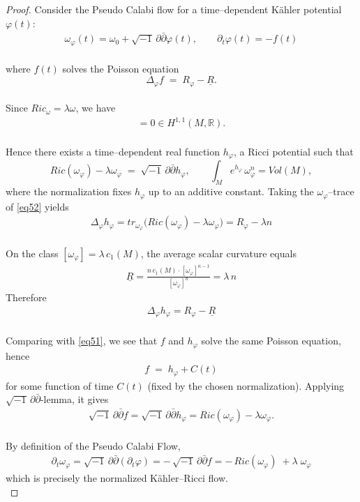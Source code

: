 \documentclass[11pt]{amsart}
\numberwithin{equation}{section}
\begin{document}
\begin{proof}
Consider the Pseudo Calabi flow for a time--dependent K\"ahler potential $\varphi(t)$:
\begin{align}
	\omega_\varphi(t)=\omega_0+\sqrt{-1}\,\partial\bar\partial\varphi(t),\qquad \partial_t\varphi(t)=-f(t)
\end{align}\\
where $f(t)$ solves the Poisson equation
\begin{equation}\label{eq51}
\Delta_{\varphi} f \;=\; R_\varphi-\underline{R}.
\end{equation}\\
Since $Ric_\omega = \lambda\omega$, we have
\begin{align}
	[Ric(\omega_\varphi) -\lambda \omega_\varphi]=0 \in H^{1,1}(M,\mathbb{R}).
\end{align}\\
Hence there exists a time--dependent real function $h_\varphi$, a Ricci potential such that
\begin{equation}\label{eq52}
	Ric(\omega_\varphi)-\lambda\omega_\varphi \;=\; \sqrt{-1}\,\partial\bar\partial h_\varphi, \qquad \int_M e^{h_\varphi}\,\omega_\varphi^n=Vol(M),
\end{equation}
where the normalization fixes $h_\varphi$ up to an additive constant. Taking the $\omega_\varphi$--trace of \eqref{eq52} yields
\begin{align}
	\Delta_{\varphi} h_\varphi = tr_{\omega_\varphi}\!\big(Ric(\omega_\varphi)-\lambda\omega_\varphi\big) = R_\varphi-\lambda n
\end{align}\\
On the class $[\omega_\varphi]= \lambda \,c_1(M)$, the average scalar curvature equals
\begin{align}
	\underline R =\frac{n\,c_1(M)\cdot [\omega_\varphi]^{n-1}}{[\omega_\varphi]^n} = \lambda\,n
\end{align}
Therefore
\begin{align}
	\Delta_{\varphi} h_\varphi = R_\varphi-\underline R
\end{align}\\
Comparing with \eqref{eq51}, we see that $f$ and $h_\varphi$ solve the same Poisson equation, hence
\begin{align}
	f \;=\; h_\varphi + C(t)
\end{align}
for some function of time $C(t)$ (fixed by the chosen normalization). Applying $\sqrt{-1}\,\partial\bar\partial$-lemma, it gives
\begin{align}
	\sqrt{-1}\,\partial\bar\partial f = \sqrt{-1}\,\partial\bar\partial h_\varphi = Ric(\omega_\varphi)-\lambda \omega_\varphi.
\end{align}\\
By definition of the Pseudo Calabi Flow,
\begin{align}
	\partial_t\omega_\varphi = \sqrt{-1}\,\partial\bar\partial(\partial_t\varphi) = -\,\sqrt{-1}\,\partial\bar\partial f = -\,Ric(\omega_\varphi)\;+\lambda \;\omega_\varphi
\end{align}
which is precisely the normalized K\"ahler--Ricci flow. \\
\end{proof}
\end{document}

